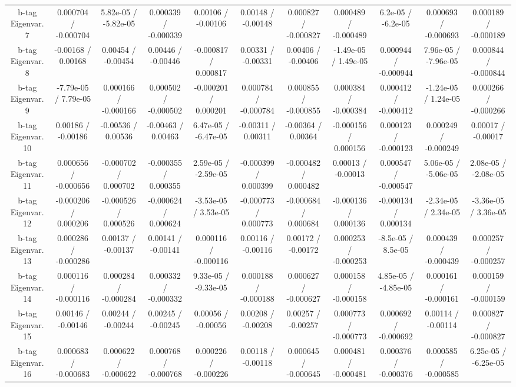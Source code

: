 \begin{table}[htbp]
\begin{center}
\begin{tabular}{|c|c|c|c|c|c|c|c|c|c|c|}
  b-tag Eigenvar. 7 & 0.000704 / -0.000704 & 5.82e-05 / -5.82e-05 & 0.000339 / -0.000339 & 0.00106 / -0.00106 & 0.00148 / -0.00148 & 0.000827 / -0.000827 & 0.000489 / -0.000489 & 6.2e-05 / -6.2e-05 & 0.000693 / -0.000693 & 0.000189 / -0.000189 \\ 
  b-tag Eigenvar. 8 & -0.00168 / 0.00168 & 0.00454 / -0.00454 & 0.00446 / -0.00446 & -0.000817 / 0.000817 & 0.00331 / -0.00331 & 0.00406 / -0.00406 & -1.49e-05 / 1.49e-05 & 0.000944 / -0.000944 & 7.96e-05 / -7.96e-05 & 0.000844 / -0.000844 \\ 
  b-tag Eigenvar. 9 & -7.79e-05 / 7.79e-05 & 0.000166 / -0.000166 & 0.000502 / -0.000502 & -0.000201 / 0.000201 & 0.000784 / -0.000784 & 0.000855 / -0.000855 & 0.000384 / -0.000384 & 0.000412 / -0.000412 & -1.24e-05 / 1.24e-05 & 0.000266 / -0.000266 \\ 
  b-tag Eigenvar. 10 & 0.00186 / -0.00186 & -0.00536 / 0.00536 & -0.00463 / 0.00463 & 6.47e-05 / -6.47e-05 & -0.00311 / 0.00311 & -0.00364 / 0.00364 & -0.000156 / 0.000156 & 0.000123 / -0.000123 & 0.000249 / -0.000249 & 0.00017 / -0.00017 \\ 
  b-tag Eigenvar. 11 & 0.000656 / -0.000656 & -0.000702 / 0.000702 & -0.000355 / 0.000355 & 2.59e-05 / -2.59e-05 & -0.000399 / 0.000399 & -0.000482 / 0.000482 & 0.00013 / -0.00013 & 0.000547 / -0.000547 & 5.06e-05 / -5.06e-05 & 2.08e-05 / -2.08e-05 \\ 
  b-tag Eigenvar. 12 & -0.000206 / 0.000206 & -0.000526 / 0.000526 & -0.000624 / 0.000624 & -3.53e-05 / 3.53e-05 & -0.000773 / 0.000773 & -0.000684 / 0.000684 & -0.000136 / 0.000136 & -0.000134 / 0.000134 & -2.34e-05 / 2.34e-05 & -3.36e-05 / 3.36e-05 \\ 
  b-tag Eigenvar. 13 & 0.000286 / -0.000286 & 0.00137 / -0.00137 & 0.00141 / -0.00141 & 0.000116 / -0.000116 & 0.00116 / -0.00116 & 0.00172 / -0.00172 & 0.000253 / -0.000253 & -8.5e-05 / 8.5e-05 & 0.000439 / -0.000439 & 0.000257 / -0.000257 \\ 
  b-tag Eigenvar. 14 & 0.000116 / -0.000116 & 0.000284 / -0.000284 & 0.000332 / -0.000332 & 9.33e-05 / -9.33e-05 & 0.000188 / -0.000188 & 0.000627 / -0.000627 & 0.000158 / -0.000158 & 4.85e-05 / -4.85e-05 & 0.000161 / -0.000161 & 0.000159 / -0.000159 \\ 
  b-tag Eigenvar. 15 & 0.00146 / -0.00146 & 0.00244 / -0.00244 & 0.00245 / -0.00245 & 0.00056 / -0.00056 & 0.00208 / -0.00208 & 0.00257 / -0.00257 & 0.000773 / -0.000773 & 0.000692 / -0.000692 & 0.00114 / -0.00114 & 0.000827 / -0.000827 \\ 
  b-tag Eigenvar. 16 & 0.000683 / -0.000683 & 0.000622 / -0.000622 & 0.000768 / -0.000768 & 0.000226 / -0.000226 & 0.00118 / -0.00118 & 0.000645 / -0.000645 & 0.000481 / -0.000481 & 0.000376 / -0.000376 & 0.000585 / -0.000585 & 6.25e-05 / -6.25e-05 \\ 

\end{tabular}
\end{center}
\end{table}
